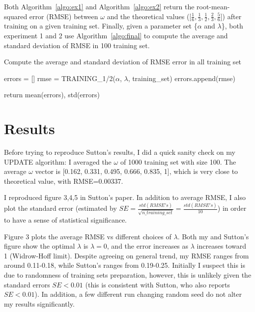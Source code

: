 \documentclass{article}
\begin{document}
Both Algorithm~\ref{algo:ex1} and Algorithm~\ref{algo:ex2} return the root-mean-squared error (RMSE) between $\omega$ and the theoretical values ([$\frac{1}{6},\frac{1}{3},\frac{1}{2},\frac{2}{3},\frac{5}{6}$]) after training on a given training set. Finally, given a parameter set \{$\alpha$ and $\lambda$\}, both experiment 1 and 2 use Algorithm~\ref{algo:final} to compute the average and standard deviation of RMSE in 100 training set.

\begin{algorithm}[h!]
\caption{Compute the average and standard deviation of RMSE error in all training set}
\begin{algorithmic}
    \State errors = []
        \State rmse = TRAINING\_1/2($\alpha$, $\lambda$, training\_set)
        \State errors.append(rmse)
    \EndFor
    
    \State return mean(errors), std(errors)
\EndFunction
\end{algorithmic}
\label{algo:final}
\end{algorithm}

\section{Results}
Before trying to reproduce Sutton's results, I did a quick sanity check on my UPDATE algorithm: I averaged the $\omega$ of 1000 training set with size 100. The average $\omega$ vector is [0.162, 0.331, 0.495, 0.666, 0.835, 1], which is very close to theoretical value, with RMSE=0.00337.

I reproduced figure 3,4,5 in Sutton's paper. In addition to average RMSE, I also plot the standard error (estimated by $SE=\frac{std(RMSE's)}{\sqrt{n\_training\_set}}=\frac{std(RMSE's)}{10}$) in order to have a sense of statistical significance. 

Figure 3 plots the average RMSE vs different choices of $\lambda$. Both my and Sutton's figure show the optimal $\lambda$ is $\lambda=0$, and the error increases as $\lambda$ increases toward 1 (Widrow-Hoff limit). Despite agreeing on general trend, my RMSE ranges from around 0.11-0.18, while Sutton's ranges from 0.19-0.25. Initially I suspect this is due to randomness of training sets preparation, however, this is unlikely given the standard errors $SE<0.01$ (this is consistent with Sutton, who also reports $SE<0.01$). In addition, a few different run changing random seed do not alter my results significantly.
\end{document}

